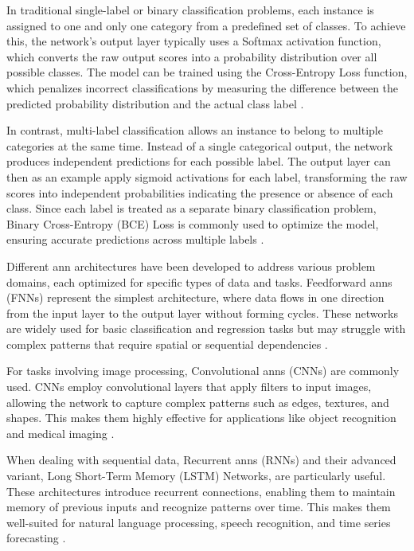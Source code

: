 In traditional single-label or binary classification problems, each instance is assigned to one and only one category from a predefined set of classes.
To achieve this, the network's output layer typically uses a Softmax activation function, which converts the raw output scores into a probability distribution over all possible classes.
The model can be trained using the Cross-Entropy Loss function, which penalizes incorrect classifications by measuring the difference between the predicted probability distribution and the actual class label \cite{russell2016artificial,herrera2016multilabel}.

In contrast, multi-label classification allows an instance to belong to multiple categories at the same time.
Instead of a single categorical output, the network produces independent predictions for each possible label.
The output layer can then as an example apply sigmoid activations for each label, transforming the raw scores into independent probabilities indicating the presence or absence of each class.
Since each label is treated as a separate binary classification problem, Binary Cross-Entropy (BCE) Loss is commonly used to optimize the model, ensuring accurate predictions across multiple labels \cite{russell2016artificial,herrera2016multilabel}.

Different \ac{ann} architectures have been developed to address various problem domains, each optimized for specific types of data and tasks.
Feedforward \ac{ann}s (FNNs) represent the simplest architecture, where data flows in one direction from the input layer to the output layer without forming cycles.
These networks are widely used for basic classification and regression tasks but may struggle with complex patterns that require spatial or sequential dependencies \cite{russell2016artificial,glorot2010understanding}.

For tasks involving image processing, Convolutional \ac{ann}s (CNNs) are commonly used.
CNNs employ convolutional layers that apply filters to input images, allowing the network to capture complex patterns such as edges, textures, and shapes.
This makes them highly effective for applications like object recognition and medical imaging \cite{o2015introduction}.

When dealing with sequential data, Recurrent \ac{ann}s (RNNs) and their advanced variant, Long Short-Term Memory (LSTM) Networks, are particularly useful.
These architectures introduce recurrent connections, enabling them to maintain memory of previous inputs and recognize patterns over time.
This makes them well-suited for natural language processing, speech recognition, and time series forecasting \cite{medsker2001recurrent}.

